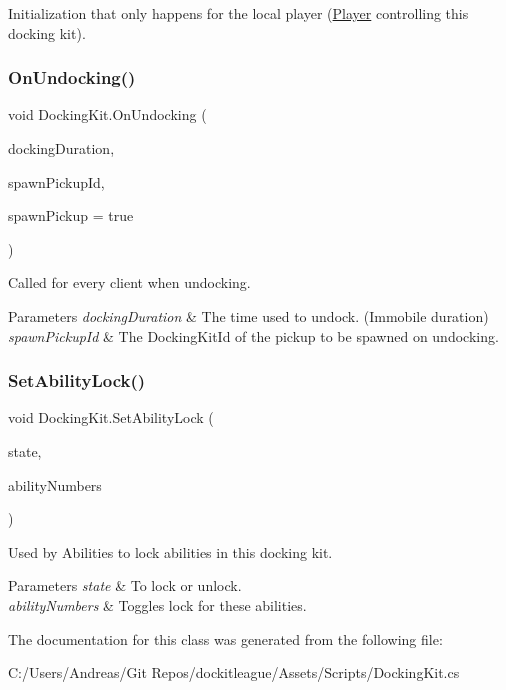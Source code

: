 Initialization that only happens for the local player (\hyperlink{class_player}{Player} controlling this docking kit). 

\hypertarget{class_docking_kit_a7e7c524ffdc103a3ecc5736333641792}{}\label{class_docking_kit_a7e7c524ffdc103a3ecc5736333641792} 
\subsubsection{\texorpdfstring{On\+Undocking()}{OnUndocking()}}
{\footnotesize\ttfamily void Docking\+Kit.\+On\+Undocking (\begin{DoxyParamCaption}\item[{float}]{docking\+Duration,  }\item[{Docking\+Kit\+Id}]{spawn\+Pickup\+Id,  }\item[{bool}]{spawn\+Pickup = {\ttfamily true} }\end{DoxyParamCaption})}



Called for every client when undocking. 


\begin{DoxyParams}{Parameters}
{\em docking\+Duration} & The time used to undock. (Immobile duration)\\
\hline
{\em spawn\+Pickup\+Id} & The Docking\+Kit\+Id of the pickup to be spawned on undocking.\\
\hline
\end{DoxyParams}
\hypertarget{class_docking_kit_a139a8cf5ba76e6a2237ddce824459d0c}{}\label{class_docking_kit_a139a8cf5ba76e6a2237ddce824459d0c} 
\subsubsection{\texorpdfstring{Set\+Ability\+Lock()}{SetAbilityLock()}}
{\footnotesize\ttfamily void Docking\+Kit.\+Set\+Ability\+Lock (\begin{DoxyParamCaption}\item[{bool}]{state,  }\item[{params int \mbox{[}$\,$\mbox{]}}]{ability\+Numbers }\end{DoxyParamCaption})}



Used by Abilities to lock abilities in this docking kit. 


\begin{DoxyParams}{Parameters}
{\em state} & To lock or unlock.\\
\hline
{\em ability\+Numbers} & Toggles lock for these abilities.\\
\hline
\end{DoxyParams}


The documentation for this class was generated from the following file\+:\begin{DoxyCompactItemize}
\item 
C\+:/\+Users/\+Andreas/\+Git Repos/dockitleague/\+Assets/\+Scripts/Docking\+Kit.\+cs\end{DoxyCompactItemize}
